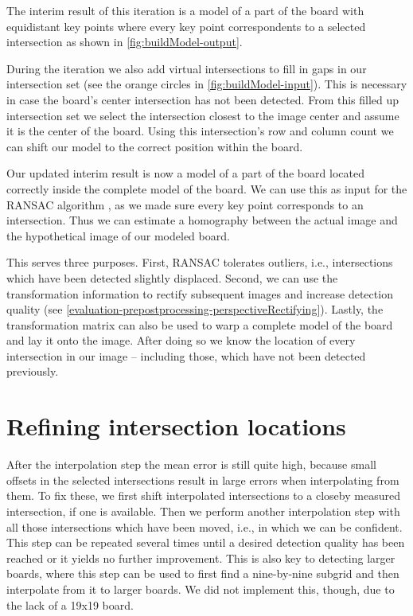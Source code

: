 	The interim result of this iteration is a model of a part of the board with equidistant key points where every key point correspondents to a selected intersection as shown in \autoref{fig:buildModel-output}.

	During the iteration we also add virtual intersections to fill in gaps in our intersection set (see the orange circles in \autoref{fig:buildModel-input}). This is necessary in case the board's center intersection has not been detected. From this filled up intersection set we select the intersection closest to the image center and assume it is the center of the board. Using this intersection's row and column count we can shift our model to the correct position within the board.

	Our updated interim result is now a model of a part of the board located correctly inside the complete model of the board. We can use this as input for the RANSAC algorithm \cite{fischler1981random}, as we made sure every key point corresponds to an intersection. Thus we can estimate a homography between the actual image and the hypothetical image of our modeled board.

	This serves three purposes. First, RANSAC tolerates outliers, i.e., intersections which have been detected slightly displaced. Second, we can use the transformation information to rectify subsequent images and increase detection quality (see \autoref{evaluation-prepostprocessing-perspectiveRectifying}). Lastly, the transformation matrix can also be used to warp a complete model of the board and lay it onto the image. After doing so we know the location of every intersection in our image -- including those, which have not been detected previously.

	\section{Refining intersection locations}
	\label{detector-postprocessing}
	After the interpolation step the mean error is still quite high, because small offsets in the selected intersections result in large errors when interpolating from them. To fix these, we first shift interpolated intersections to a closeby measured intersection, if one is available. Then we perform another interpolation step with all those intersections which have been moved, i.e., in which we can be confident. This step can be repeated several times until a desired detection quality has been reached or it yields no further improvement. This is also key to detecting larger boards, where this step can be used to first find a nine-by-nine subgrid and then interpolate from it to larger boards. We did not implement this, though, due to the lack of a 19x19 board.

